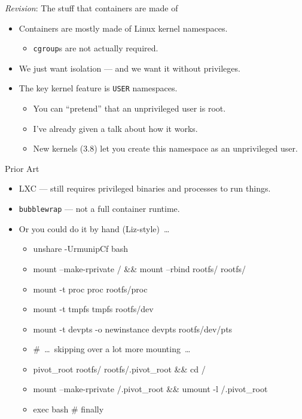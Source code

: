 \documentclass[10pt,aspectratio=169]{beamer}
\begin{document}
	\begin{frame}{\textit{Revision}: The stuff that containers are made of}
		\begin{itemize}
			\item Containers are mostly made of Linux kernel namespaces.
			\begin{itemize}
				\item \texttt{cgroup}s are not actually required.
			\end{itemize}
			\item We just want isolation --- and we want it without privileges.
			\item The key kernel feature is \texttt{USER} namespaces.
			\begin{itemize}
				\item You can ``pretend'' that an unprivileged user is root.
    			\item I've already given a talk about how it works.
    			\item New kernels ($3.8$) let you create this namespace as an unprivileged user.
			\end{itemize}
		\end{itemize}
	\end{frame}


	\begin{frame}{Prior Art}
		\begin{itemize}
		    \item LXC --- still requires privileged binaries and processes to run things.
		    \item \texttt{bubblewrap} --- not a full container runtime.
		    \item<2-> Or you could do it by hand (Liz-style)~\dots
			\begin{itemize}
				\tt
				\item<3-> {unshare -UrmunipCf bash}
				\item<3-> {mount --make-rprivate / \&\& mount --rbind rootfs/ rootfs/}
				\item<3-> {mount -t proc proc rootfs/proc}
				\item<3-> {mount -t tmpfs tmpfs rootfs/dev}
				\item<3-> {mount -t devpts -o newinstance devpts rootfs/dev/pts}
				\item<3-> {\#~\dots~skipping over a lot more mounting~\dots}
				\item<3-> {pivot\_root rootfs/ rootfs/.pivot\_root \&\& cd /}
				\item<3-> {mount --make-rprivate /.pivot\_root \&\& umount -l /.pivot\_root}
				\item<3-> {exec bash \# finally}
			\end{itemize}
		\end{itemize}
	\end{frame}
\end{document}
